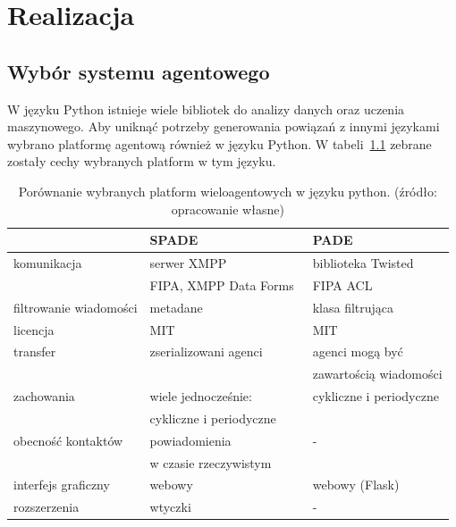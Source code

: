 \documentclass[11pt]{report}
\begin{document}
    \chapter{Realizacja}\label{ch:realizacja}


    \section{Wybór systemu agentowego}

    W języku Python istnieje wiele bibliotek do analizy danych oraz uczenia maszynowego.
    Aby uniknąć potrzeby generowania powiązań z innymi językami wybrano platformę agentową również w języku Python.
    W tabeli~\ref{tab:porownanie} zebrane zostały cechy wybranych platform w tym języku.

    \begin{table}[]
        \begin{tabular}{l|ll}
            & SPADE                                   & PADE                     \\ \hline
            komunikacja            & serwer XMPP                             & biblioteka Twisted       \\
            & FIPA, XMPP Data Forms~\cite{data_forms} & FIPA ACL~\cite{fipa_acl} \\ \hline
            filtrowanie wiadomości & metadane                                & klasa filtrująca         \\ \hline
            licencja               & MIT                                     & MIT                      \\ \hline
            transfer               & zserializowani agenci                   & agenci mogą być          \\
            &                                         & zawartością wiadomości   \\ \hline
            zachowania             & wiele jednocześnie:                     & cykliczne i periodyczne  \\
            & cykliczne i periodyczne \\ \hline
            obecność kontaktów     & powiadomienia                           & -                        \\
            & w czasie rzeczywistym \\ \hline
            interfejs graficzny    & webowy                                  & webowy (Flask)           \\ \hline
            rozszerzenia           & wtyczki                                 & -                        \\ \hline \hline
        \end{tabular}
        \caption{Porównanie wybranych platform wieloagentowych w języku python. (źródło: opracowanie własne)}
        \label{tab:porownanie}
    \end{table}
\end{document}
